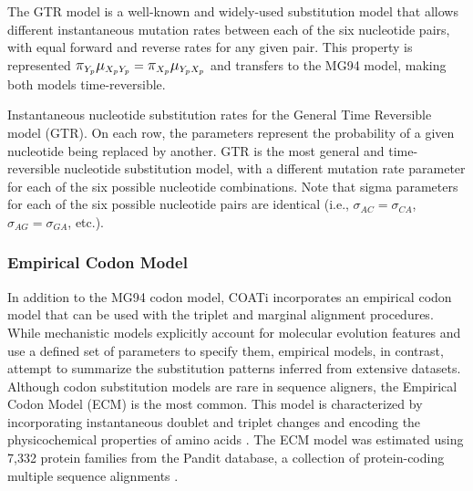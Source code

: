 The GTR model is a well-known and widely-used substitution model that allows different instantaneous mutation rates between each of the six nucleotide pairs, with equal forward and reverse rates for any given pair. This property is represented
$\grande{\pi}_{Y_p} \grande{\mu}_{X_pY_p} = \grande{\pi}_{X_p} \grande{\mu}_{Y_pX_p}$
and transfers to the MG94 model,
making both models time-reversible.

\begin{table}[!ht]
\centering

 \vspace{2mm}
 \caption[General Time Reversible Model]{Instantaneous nucleotide substitution rates for the General Time Reversible model (GTR). On each row, the parameters represent the probability of a given nucleotide being replaced by another. GTR is the most general and time-reversible nucleotide substitution model, with a different mutation rate parameter for each of the six possible nucleotide combinations. Note that sigma parameters for each of the six possible nucleotide pairs are identical (i.e., $\sigma_{AC} = \sigma_{CA}$, $\sigma_{AG} = \sigma_{GA}$, etc.).}
 \label{table:gtr-ch2}
\end{table}

\subsubsection{Empirical Codon Model}

In addition to the MG94 codon model, COATi incorporates an empirical codon model that can be used with the triplet and marginal alignment procedures. While mechanistic models explicitly account for molecular evolution features and use a defined set of parameters to specify them, empirical models, in contrast, attempt to summarize the substitution patterns inferred from extensive datasets. Although codon substitution models are rare in sequence aligners, the Empirical Codon Model (ECM) is the most common. This model is characterized by incorporating instantaneous doublet and triplet changes and encoding the physicochemical properties of amino acids \citep{kosiol_ECM_2007}. The ECM model was estimated using 7,332 protein families from the Pandit database, a collection of protein-coding multiple sequence alignments \citep{whelan2006pandit}. 

